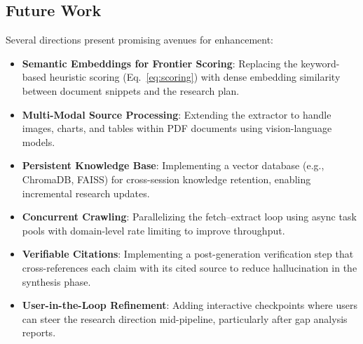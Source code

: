 \documentclass[conference]{IEEEtran}
\begin{document}
\subsection{Future Work}

Several directions present promising avenues for enhancement:

\begin{itemize}
    \item \textbf{Semantic Embeddings for Frontier Scoring}: Replacing the keyword-based heuristic scoring (Eq.~\ref{eq:scoring}) with dense embedding similarity between document snippets and the research plan.
    \item \textbf{Multi-Modal Source Processing}: Extending the extractor to handle images, charts, and tables within PDF documents using vision-language models.
    \item \textbf{Persistent Knowledge Base}: Implementing a vector database (e.g., ChromaDB, FAISS) for cross-session knowledge retention, enabling incremental research updates.
    \item \textbf{Concurrent Crawling}: Parallelizing the fetch--extract loop using async task pools with domain-level rate limiting to improve throughput.
    \item \textbf{Verifiable Citations}: Implementing a post-generation verification step that cross-references each claim with its cited source to reduce hallucination in the synthesis phase.
    \item \textbf{User-in-the-Loop Refinement}: Adding interactive checkpoints where users can steer the research direction mid-pipeline, particularly after gap analysis reports.
\end{itemize}
\end{document}
